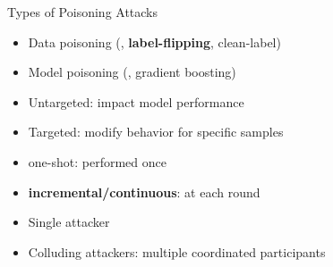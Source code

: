 \begin{frame}{Types of Poisoning Attacks}
  \vspace{1em}
  
  \setlength{\leftmargini}{5pt}
  \begin{tcbraster}[raster columns=2, raster equal height, raster column skip=2em, raster row skip=2em]
    \pause
    \begin{taxobox}
      \begin{itemize}
        \item Data poisoning (\eg, \textbf<5>{label-flipping}, clean-label)
        \item Model poisoning (\eg, gradient boosting)
      \end{itemize}
    \end{taxobox}
    \pause
    \begin{taxobox}
      \begin{itemize}
        \item Untargeted: impact model performance
        \item Targeted: modify behavior for specific samples
      \end{itemize}
    \end{taxobox}
    \pause
    \begin{taxobox}
      \begin{itemize}
        \item one-shot: performed once
        \item \textbf<5>{incremental/continuous}: at each round
      \end{itemize}
    \end{taxobox}
    \pause
    \begin{taxobox}
      \begin{itemize}
        \item Single attacker
        \item Colluding attackers: multiple coordinated participants
      \end{itemize}
    \end{taxobox}
  \end{tcbraster}
\end{frame}
  

